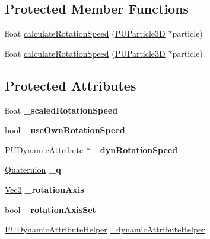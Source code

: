 \subsection*{Protected Member Functions}
\begin{DoxyCompactItemize}
\item 
float \hyperlink{classPUGeometryRotator_a4b42125d7eb3b410b67297f3b1ab824d}{calculate\+Rotation\+Speed} (\hyperlink{structPUParticle3D}{P\+U\+Particle3D} $\ast$particle)
\item 
float \hyperlink{classPUGeometryRotator_a4b42125d7eb3b410b67297f3b1ab824d}{calculate\+Rotation\+Speed} (\hyperlink{structPUParticle3D}{P\+U\+Particle3D} $\ast$particle)
\end{DoxyCompactItemize}
\subsection*{Protected Attributes}
\begin{DoxyCompactItemize}
\item 
\mbox{\label{classPUGeometryRotator_ab811786be330bf9dca02148c78084a1d}} 
float {\bfseries \+\_\+scaled\+Rotation\+Speed}
\item 
\mbox{\label{classPUGeometryRotator_a2b20a8313ee5de5b784bbd5777a21bf3}} 
bool {\bfseries \+\_\+use\+Own\+Rotation\+Speed}
\item 
\mbox{\label{classPUGeometryRotator_af71162e00a4941e3550bccf00ab6adf8}} 
\hyperlink{classPUDynamicAttribute}{P\+U\+Dynamic\+Attribute} $\ast$ {\bfseries \+\_\+dyn\+Rotation\+Speed}
\item 
\mbox{\label{classPUGeometryRotator_aadc5652f24d812006ee6f5fa6b794f13}} 
\hyperlink{classQuaternion}{Quaternion} {\bfseries \+\_\+q}
\item 
\mbox{\label{classPUGeometryRotator_a153bc7ec4075bbc38c9c8edb998a2fec}} 
\hyperlink{classVec3}{Vec3} {\bfseries \+\_\+rotation\+Axis}
\item 
\mbox{\label{classPUGeometryRotator_a8820714af0127752ed4578ff638d2de9}} 
bool {\bfseries \+\_\+rotation\+Axis\+Set}
\item 
\hyperlink{classPUDynamicAttributeHelper}{P\+U\+Dynamic\+Attribute\+Helper} \hyperlink{classPUGeometryRotator_a98df091d6ab6a08d48f489ad20de67ce}{\+\_\+dynamic\+Attribute\+Helper}
\end{DoxyCompactItemize}
